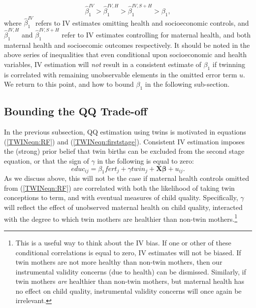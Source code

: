 \begin{equation}
\label{TWINeqn:moves}
\hat\beta_1^{IV}>\hat\beta_1^{IV,H}>\hat\beta_1^{IV,S+H}>\beta_1,
\end{equation}
where $\hat\beta_1^{IV}$ refers to IV estimates omitting health and socioeconomic
controls, and $\hat\beta_1^{IV,H}$ and $\hat\beta_1^{IV,S+H}$ refer to IV 
estimates controlling for maternal health, and both maternal health and 
socioecomic outcomes respectively. It should be noted in the above series of 
inequalities that even conditional upon socioeconomic and health variables, IV 
estimation will \emph{not} result in a consistent estimate of $\beta_1$ if 
twinning is correlated with remaining unobservable elements in the omitted error
term $u$.  We return to this point, and how to bound $\beta_1$ in the following 
sub-section.

\subsection{Bounding the QQ Trade-off}            \label{TWINsscn:methodBounds}
In the previous subsection, QQ estimation using twins is motivated in equations 
(\ref{TWINeqn:RF}) and (\ref{TWINeqn:firststage}).  Consistent IV estimation 
imposes the (strong) prior belief that twin births can be excluded from the 
second stage equation, or that the sign of $\gamma$ in the following is equal to 
zero:
\begin{equation}
\label{TWINeqn:Conley}
educ_{ij}=\beta_1 fert_j + \gamma twin_j + \bm{X}\bm{\beta} + u_{ij}.
\end{equation}
As we discuss above, this will not be the case if maternal health controls 
omitted from (\ref{TWINeqn:RF}) are correlated with both the likelihood of 
taking twin conceptions to term, and with eventual measures of child quality.
Specifically, $\gamma$ will reflect the effect of unobserved maternal health on 
child quality, interacted with the degree to which twin mothers are healthier
than non-twin mothers.\footnote{This is a useful way to think about the IV bias.
If one or other of these conditional correlations is equal to zero, IV estimates
will not be biased.  If twin mothers are not more healthy than non-twin mothers,
then our instrumental validity concerns (due to health) can be dismissed.  
Similarly, if twin mothers \emph{are} healthier than non-twin mothers, but 
maternal health has no effect on child quality, instrumental validity concerns 
will once again be irrelevant.}

